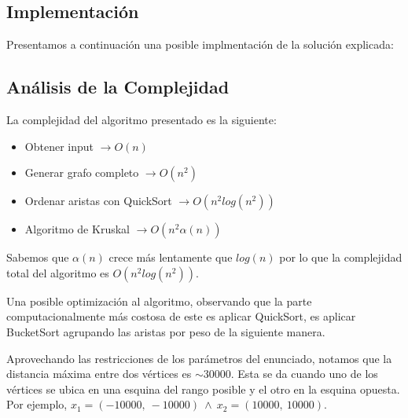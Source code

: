 \vspace{1em}

\subsection{Implementación}
\vspace{1em}

Presentamos a continuación una posible implmentación de la solución explicada:




\subsection{Análisis de la Complejidad}
\vspace{1em}


La complejidad del algoritmo presentado es la siguiente: 

\begin{itemize}
    \item Obtener input \qquad \qquad \qquad \quad $\rightarrow O(n)$
    \item Generar grafo completo \qquad \quad $\rightarrow O(n^2)$
    \item Ordenar aristas con QuickSort $\rightarrow O(n^2 log(n^2))$
    \item Algoritmo de Kruskal \qquad \qquad $\rightarrow O(n^2 \alpha(n))$
\end{itemize}

Sabemos que $\alpha(n)$ crece más lentamente que $log(n)$ por lo que la complejidad total del algoritmo es $O(n^2 log(n^2))$.

\vspace{1em}

Una posible optimización al algoritmo, observando que la parte computacionalmente más costosa de este es aplicar QuickSort, es aplicar BucketSort agrupando las aristas por peso de la siguiente manera.

\vspace{1em}

Aprovechando las restricciones de los parámetros del enunciado, notamos que la distancia máxima entre dos vértices es $\sim30000$. Esta se da cuando uno de los vértices se ubica en una esquina del rango posible y el otro en la esquina opuesta. Por ejemplo, $x_1 = (-10000, \ -10000) \ \wedge \  x_2 = (10000, \ 10000)$.

\vspace{1em}

